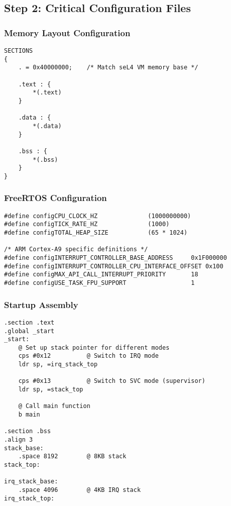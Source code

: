 \documentclass[12pt]{article}
\begin{document}
\subsection{Step 2: Critical Configuration Files}

\subsubsection{Memory Layout Configuration}

\begin{lstlisting}[caption=Linker Script (link.ld)]
SECTIONS
{
    . = 0x40000000;    /* Match seL4 VM memory base */
    
    .text : {
        *(.text)
    }
    
    .data : {
        *(.data)
    }
    
    .bss : {
        *(.bss)
    }
}
\end{lstlisting}

\subsubsection{FreeRTOS Configuration}

\begin{lstlisting}[caption=FreeRTOSConfig.h Key Settings]
#define configCPU_CLOCK_HZ              (1000000000)
#define configTICK_RATE_HZ              (1000)
#define configTOTAL_HEAP_SIZE           (65 * 1024)

/* ARM Cortex-A9 specific definitions */
#define configINTERRUPT_CONTROLLER_BASE_ADDRESS     0x1F000000
#define configINTERRUPT_CONTROLLER_CPU_INTERFACE_OFFSET 0x100
#define configMAX_API_CALL_INTERRUPT_PRIORITY       18
#define configUSE_TASK_FPU_SUPPORT                  1
\end{lstlisting}

\subsubsection{Startup Assembly}

\begin{lstlisting}[caption=startup.S - CPU Initialization, language={[x86masm]Assembler}]
.section .text
.global _start
_start:
    @ Set up stack pointer for different modes
    cps #0x12          @ Switch to IRQ mode  
    ldr sp, =irq_stack_top
    
    cps #0x13          @ Switch to SVC mode (supervisor)
    ldr sp, =stack_top
    
    @ Call main function
    b main

.section .bss
.align 3
stack_base:
    .space 8192        @ 8KB stack
stack_top:

irq_stack_base:
    .space 4096        @ 4KB IRQ stack  
irq_stack_top:
\end{lstlisting}
\end{document}
